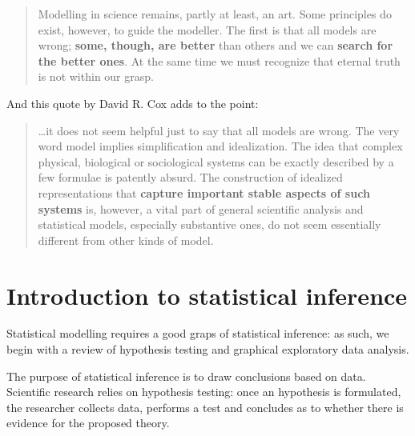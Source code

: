 \documentclass[
  11pt,
  letterpaper,
]{book}
\theoremstyle{definition}
\theoremstyle{definition}
\theoremstyle{definition}
\theoremstyle{definition}
\theoremstyle{remark}
\begin{document}
\begin{quote}
Modelling in science remains, partly at least, an art. Some principles do exist, however, to guide the modeller. The first is that all models are wrong; \textbf{some, though, are better} than others and we can \textbf{search for the better ones}. At the same time we must recognize that eternal truth is not within our grasp.
\end{quote}

And this quote by David R. Cox adds to the point:

\begin{quote}
\ldots it does not seem helpful just to say that all models are wrong. The very word model implies simplification and idealization. The idea that complex physical, biological or sociological systems can be exactly described by a few formulae is patently absurd. The construction of idealized representations that \textbf{capture important stable aspects of such systems} is, however, a vital part of general scientific analysis and statistical models, especially substantive ones, do not seem essentially different from other kinds of model.
\end{quote}

\newcommand{\bs}[1]{\boldsymbol{#1}}
\newcommand{\Hmat}{\mathbf{H}}
\newcommand{\Mmat}{\mathbf{M}}
\newcommand{\mX}{\mathbf{X}}
\newcommand{\bX}{{\mathbf{X}}}
\newcommand{\bx}{{\mathbf{x}}}
\newcommand{\by}{{\boldsymbol{y}}}
\newcommand{\bY}{{\boldsymbol{Y}}}
\newcommand{\eps}{\varepsilon}
\newcommand{\beps}{\boldsymbol{\varepsilon}}
\newcommand{\bbeta}{\boldsymbol{\beta}}
\newcommand{\hbb}{\hat{\boldsymbol{\beta}}}
\newcommand{\limni}{\lim_{n \ra \infty}}
\newcommand{\Sp}{\mathscr{S}}
\newcommand{\Hy}{\mathscr{H}}
\newcommand{\E}[2][]{{\mathsf E}_{#1}\left(#2\right)}
\newcommand{\Va}[2][]{{\mathsf{Var}_{#1}}\left(#2\right)}
\newcommand{\I}[1]{{\mathbf 1}_{#1}}

\hypertarget{intro}{%
\chapter{Introduction to statistical inference}\label{intro}}

Statistical modelling requires a good graps of statistical inference: as such, we begin with a review of hypothesis testing and graphical exploratory data analysis.

The purpose of statistical inference is to draw conclusions based on data. Scientific research relies on hypothesis testing: once an hypothesis is formulated, the researcher collects data, performs a test and concludes as to whether there is evidence for the proposed theory.
\end{document}
